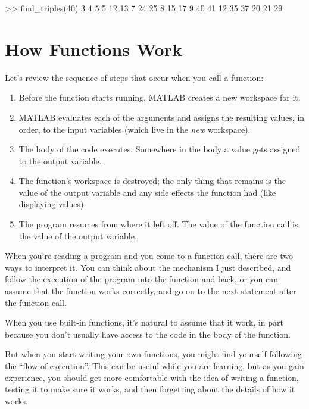 \begin{code}
>> find_triples(40)
     3     4     5
     5    12    13
     7    24    25
     8    15    17
     9    40    41
    12    35    37
    20    21    29
\end{code}


\section{How Functions Work}

Let's review the sequence of steps that occur when you call a function:

\begin{enumerate}

\item Before the function starts running, MATLAB creates a new
workspace for it.

\item MATLAB evaluates each of the arguments and assigns
the resulting values, in order, to the input variables (which
live in the {\em new} workspace).

\item The body of the code executes.  Somewhere in the body
a value gets assigned to the output variable.

\item The function's workspace is destroyed; the only thing
that remains is the value of the output variable and any side
effects the function had (like displaying values).

\item The program resumes from where it left off.  The value
of the function call is the value of the output variable.

\end{enumerate}

When you're reading a program and you come to a function call,
there are two ways to interpret it. You can think about the mechanism I just described,
and follow the execution of the program into the function and back, or you can assume that the function works correctly, and go on to the next statement after the function call.

When you use built-in functions, it's natural to assume that it work, in part because you don't
usually have access to the code in the body of the function.

But when you start writing your own functions, you might
find yourself following the ``flow of execution''.  This can
be useful while you are learning, but as you gain experience, you
should get more comfortable with the idea of writing a function,
testing it to make sure it works, and then forgetting about the
details of how it works.

